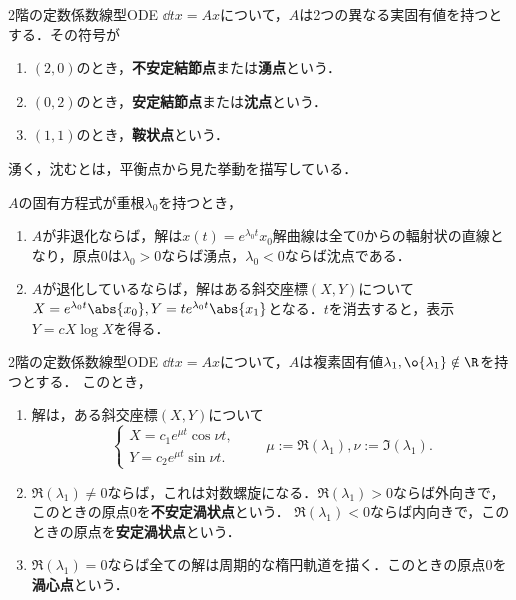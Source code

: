 \documentclass[uplatex,dvipdfmx]{jsreport}
\begin{document}
\begin{definition}
    2階の定数係数線型ODE $\dd{}{t}x=Ax$について，$A$は2つの異なる実固有値を持つとする．その符号が
    \begin{enumerate}
        \item $(2,0)$のとき，\textbf{不安定結節点}または\textbf{湧点}という．
        \item $(0,2)$のとき，\textbf{安定結節点}または\textbf{沈点}という．
        \item $(1,1)$のとき，\textbf{鞍状点}という．
    \end{enumerate}
    湧く，沈むとは，平衡点から見た挙動を描写している．
\end{definition}
\begin{remark}
    $A$の固有方程式が重根$\lambda_0$を持つとき，
    \begin{enumerate}
        \item $A$が非退化ならば，解は$x(t)=e^{\lambda_0t}x_0$解曲線は全て$0$からの輻射状の直線となり，原点$0$は$\lambda_0>0$ならば湧点，$\lambda_0<0$ならば沈点である．
        \item $A$が退化しているならば，解はある斜交座標$(X,Y)$について$X=e^{\lambda_0t}\abs{x_0},Y=te^{\lambda_0t}\abs{x_1}$となる．$t$を消去すると，表示$Y=cX\log X$を得る．
    \end{enumerate}
\end{remark}

\begin{proposition}
    2階の定数係数線型ODE $\dd{}{t}x=Ax$について，$A$は複素固有値$\lambda_1,\o{\lambda_1}\notin\R$を持つとする．
    このとき，
    \begin{enumerate}
        \item 解は，ある斜交座標$(X,Y)$について
        \[\begin{cases}
            X=c_1e^{\mu t}\cos\nu t,\\
            Y=c_2e^{\mu t}\sin\nu t.
        \end{cases}\qquad\mu:=\Re(\lambda_1),\nu:=\Im(\lambda_1).\]
        \item $\Re(\lambda_1)\ne0$ならば，これは対数螺旋になる．$\Re(\lambda_1)>0$ならば外向きで，このときの原点$0$を\textbf{不安定渦状点}という．
        $\Re(\lambda_1)<0$ならば内向きで，このときの原点を\textbf{安定渦状点}という．
        \item $\Re(\lambda_1)=0$ならば全ての解は周期的な楕円軌道を描く．このときの原点$0$を\textbf{渦心点}という．
    \end{enumerate}
\end{proposition}
\end{document}
